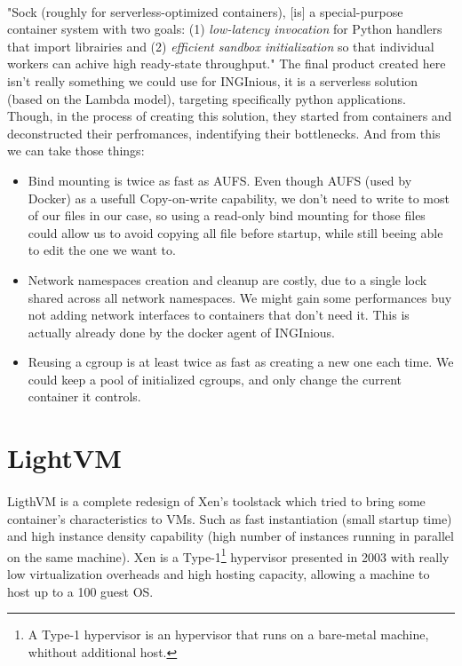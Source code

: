 \paragraph{}"Sock (roughly for serverless-optimized containers), [is] a special-purpose container system with two goals: (1) \textit{low-latency invocation} for Python handlers that import librairies and (2) \textit{efficient sandbox initialization} so that individual workers can achive high ready-state throughput." \cite{oakes2018sock}  The final product created here isn't really something we could use for INGInious, it is a serverless solution (based on the Lambda model), targeting specifically python applications.  Though, in the process of creating this solution, they started from containers and deconstructed their perfromances, indentifying their bottlenecks.  And from this we can take those things:
\begin{itemize}
\renewcommand\labelitemi{--}
  \item Bind mounting is twice as fast as AUFS.  Even though AUFS (used by Docker) as a usefull Copy-on-write capability, we don't need to write to most of our files in our case, so using a read-only bind mounting for those files could allow us to avoid copying all file before startup, while still beeing able to edit the one we want to.
  \item Network namespaces creation and cleanup are costly, due to a single lock shared across all network namespaces.  We might gain some performances buy not adding network interfaces to containers that don't need it.  This is actually already done by the docker agent of INGInious.
  \item Reusing a cgroup is at least twice as fast as creating a new one each time.  We could keep a pool of initialized cgroups, and only change the current container it controls.
\end{itemize}

\section{LightVM} 
\paragraph{}LigthVM is a complete redesign of Xen's toolstack which tried to bring some container's characteristics to VMs.  Such as fast instantiation (small startup time) and high instance density capability (high number of instances running in parallel on the same machine).\cite{manco2017my}  Xen is a Type-1\footnote{A Type-1 hypervisor is an hypervisor that runs on a bare-metal machine, whithout additional host.} hypervisor presented in 2003 with really low virtualization overheads and high hosting capacity, allowing a machine to host up to a 100 guest OS.\cite{barham2003xen}  

